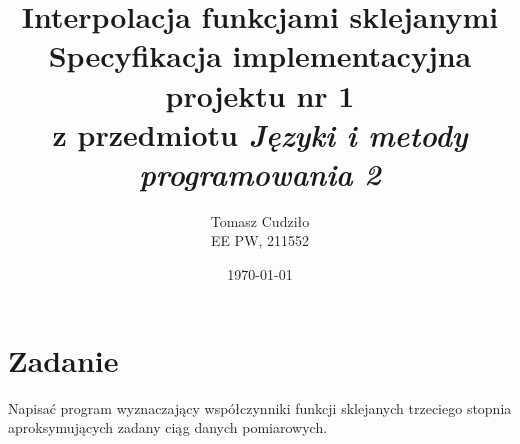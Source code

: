 \documentclass[12pt,a4paper]{article}
\begin{document}
\title{ 
  Interpolacja funkcjami sklejanymi\\
  {\normalsize Specyfikacja implementacyjna projektu nr 1}\\\vspace{-12pt}
  {\normalsize z przedmiotu \emph{Języki i metody programowania 2}}
}
\author{
  Tomasz Cudziło\\
  {\small EE PW, 211552}
}
\date{\today}
\maketitle

\section*{Zadanie}
\label{sec:zadanie}

Napisać program wyznaczający współczynniki funkcji sklejanych trzeciego stopnia
aproksymujących zadany ciąg danych pomiarowych.

\vspace{24pt}
\end{document}
